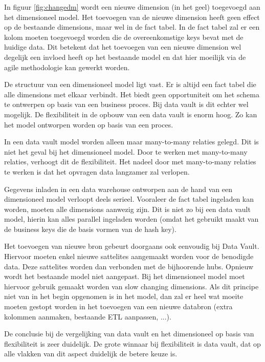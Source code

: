 In figuur \ref{fig:changedm} wordt een nieuwe dimension (in het geel) toegevoegd aan het dimensioneel model. Het toevoegen van de nieuwe dimension heeft geen effect op de bestaande dimensions, maar wel in de fact tabel. In de fact tabel zal er een kolom moeten toegevoegd worden die de overeenkomstige keys bevat met de huidige data. Dit betekent dat het toevoegen van een nieuwe dimension wel degelijk een invloed heeft op het bestaande model en dat hier moeilijk via de agile methodologie kan gewerkt worden.

De structuur van een dimensioneel model ligt vast. Er is altijd een fact tabel die alle dimensions met elkaar verbindt. Het biedt geen opportuniteit om het schema te ontwerpen op basis van een business proces. Bij data vault is dit echter wel mogelijk. De flexibiliteit in de opbouw van een data vault is enorm hoog. Zo kan het model ontworpen worden op basis van een proces.

In een data vault model worden alleen maar many-to-many relaties gelegd. Dit is niet het geval bij het dimensioneel model. Door te werken met many-to-many relaties, verhoogt dit de flexibiliteit. Het nadeel door met many-to-many relaties te werken is dat het opvragen data langzamer zal verlopen.

Gegevens inladen in een data warehouse ontworpen aan de hand van een dimensioneel model verloopt deels serieel. Vooraleer de fact tabel ingeladen kan worden, moeten alle dimensions aanwezig zijn. Dit is niet zo bij een data vault model, hierin kan alles parallel ingeladen worden (omdat het gebruikt maakt van de business keys die de basis vormen van de hash key).

Het toevoegen van nieuwe bron gebeurt doorgaans ook eenvoudig bij Data Vault. Hiervoor moeten enkel nieuwe sattelites aangemaakt worden voor de benodigde data. Deze sattelites worden dan verbonden met de bijhoorende hubs. Opnieuw wordt het bestaande model niet aangepast. Bij het dimensioneel model moet hiervoor gebruik gemaakt worden van slow changing dimensions. Als dit principe niet van in het begin opgenomen is in het model, dan zal er heel wat moeite moeten gestopt worden in het toevoegen van een nieuwe databron (extra kolommen aanmaken, bestaande ETL aanpassen, ...).

De conclusie bij de vergelijking van data vault en het dimensioneel op basis van flexibiliteit is zeer duidelijk. De grote winnaar bij flexibiliteit is data vault, dat op alle vlakken van dit aspect duidelijk de betere keuze is.

